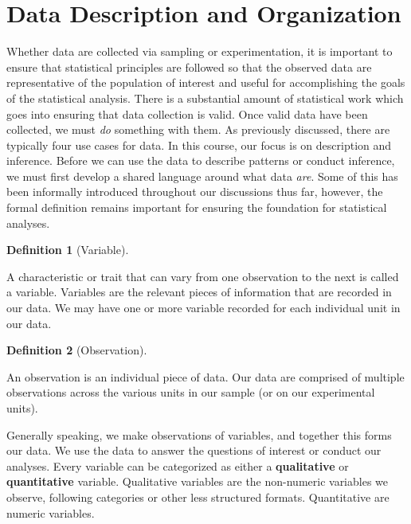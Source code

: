 \documentclass[
  letterpaper,
  DIV=11,
  numbers=noendperiod]{scrreprt}
\theoremstyle{definition}
\theoremstyle{definition}
\theoremstyle{definition}
\newtheorem{definition}{Definition}[chapter]
\theoremstyle{remark}
\begin{document}
\section{Data Description and
Organization}\label{data-description-and-organization}

Whether data are collected via sampling or experimentation, it is
important to ensure that statistical principles are followed so that the
observed data are representative of the population of interest and
useful for accomplishing the goals of the statistical analysis. There is
a substantial amount of statistical work which goes into ensuring that
data collection is valid. Once valid data have been collected, we must
\emph{do} something with them. As previously discussed, there are
typically four use cases for data. In this course, our focus is on
description and inference. Before we can use the data to describe
patterns or conduct inference, we must first develop a shared language
around what data \emph{are}. Some of this has been informally introduced
throughout our discussions thus far, however, the formal definition
remains important for ensuring the foundation for statistical analyses.

\begin{definition}[Variable]\protect\hypertarget{def-variable}{}\label{def-variable}

A characteristic or trait that can vary from one observation to the next
is called a variable. Variables are the relevant pieces of information
that are recorded in our data. We may have one or more variable recorded
for each individual unit in our data.

\end{definition}

\begin{definition}[Observation]\protect\hypertarget{def-observation}{}\label{def-observation}

An observation is an individual piece of data. Our data are comprised of
multiple observations across the various units in our sample (or on our
experimental units).

\end{definition}

Generally speaking, we make observations of variables, and together this
forms our data. We use the data to answer the questions of interest or
conduct our analyses. Every variable can be categorized as either a
\textbf{qualitative} or \textbf{quantitative} variable. Qualitative
variables are the non-numeric variables we observe, following categories
or other less structured formats. Quantitative are numeric variables.
\end{document}
